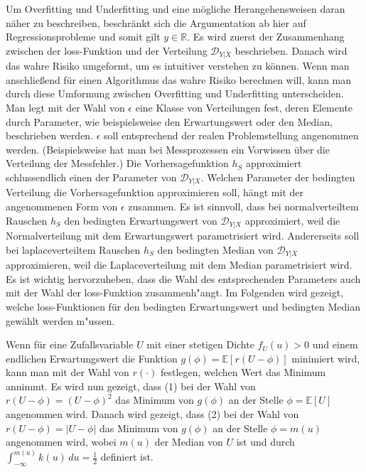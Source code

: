 Um Overfitting und Underfitting und eine m\"ogliche Herangehensweisen daran n\"aher zu beschreiben, beschr\"ankt sich die Argumentation ab hier auf Regressionsprobleme und somit gilt
$y \in \mathbb{R}$. Es wird zuerst der Zusammenhang zwischen der loss-Funktion und der Verteilung $\mathcal{D}_{Y|X}$ beschrieben. Danach 
wird das wahre Risiko umgeformt, um es intuitiver verstehen zu k\"onnen. Wenn man anschlie{\ss}end f\"ur einen Algorithmus das wahre Risiko berechnen will,
kann man durch diese Umformung zwischen Overfitting und Underfitting unterscheiden. \\


Man legt mit der Wahl von $\epsilon$ eine Klasse von Verteilungen fest, deren Elemente durch Parameter, wie beispielsweise den Erwartungswert oder den Median,  
beschrieben werden. $\epsilon$ soll entsprechend der realen Problemstellung angenommen werden. 
(Beispielsweise hat man bei Messprozessen ein Vorwissen \"uber die Verteilung der Messfehler.) 
Die Vorhersagefunktion $h_S$ approximiert schlussendlich einen 
der Parameter von $\mathcal{D}_{Y|X}$. Welchen Parameter der bedingten Verteilung die Vorhersagefunktion approximieren soll, h\"angt 
mit der angenommenen Form von $\epsilon$ zusammen. Es ist sinnvoll, dass bei normalverteiltem Rauschen 
$h_S$ den bedingten Erwartungswert von $\mathcal{D}_{Y|X}$ approximiert, weil die Normalverteilung mit dem Erwartungswert parametrisiert wird. 
Andererseits soll bei laplaceverteiltem Rauschen $h_S$ den bedingten Median von $\mathcal{D}_{Y|X}$ approximieren, weil die 
Laplaceverteilung mit dem Median parametrisiert wird. \\


Es ist wichtig hervorzuheben, dass die Wahl des entsprechenden Parameters auch mit der Wahl der loss-Funktion zusammenh"angt. 
Im Folgenden wird gezeigt, welche loss-Funktionen f\"ur den bedingten Erwartungswert und bedingten Median gew\"ahlt werden m"ussen.


Wenn f\"ur eine Zufallsvariable $U$ mit einer stetigen Dichte $f_U(u) > 0$ und einem endlichen Erwartungswert die Funktion $g(\phi) = \mathbb{E}[r(U - \phi)]$ minimiert wird, 
kann man mit der Wahl von $r(\cdot)$ 
festlegen, welchen Wert das Minimum annimmt. Es wird nun gezeigt, dass (1) bei der Wahl von $r(U - \phi) = (U - \phi)^2$ das Minimum von $g(\phi)$ an der Stelle 
$\phi = \mathbb{E}[U]$ angenommen wird. Danach wird gezeigt, dass (2) bei der Wahl von $r(U - \phi) = |U - \phi|$ das Minimum von $g(\phi)$ an der Stelle 
$\phi = m(u)$ angenommen wird, wobei $m(u)$ der Median von $U$ ist und durch $\int_{-\infty}^{m(u)} k(u) \, du = \frac{1}{2}$ definiert ist. 

